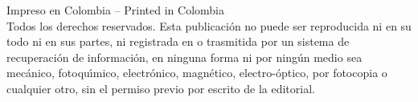 \vfill

\begin{tiny}
\begin{flushleft}
\noindent  Impreso en Colombia -- Printed in Colombia\\

\noindent Todos los derechos reservados. Esta publicaci{\'o}n no puede
ser reproducida ni en su todo ni en sus partes, ni registrada en o
trasmitida por un sistema de recuperaci{\'o}n de informaci{\'o}n, en ninguna
forma ni por ning{\'u}n medio sea mec{\'a}nico, fotoqu\'{\i}mico, electr{\'o}nico,
magn{\'e}tico, electro-{\'o}ptico, por fotocopia o cualquier otro, sin el
permiso previo por escrito de la editorial.
\end{flushleft}
\end{tiny}

\endinput 